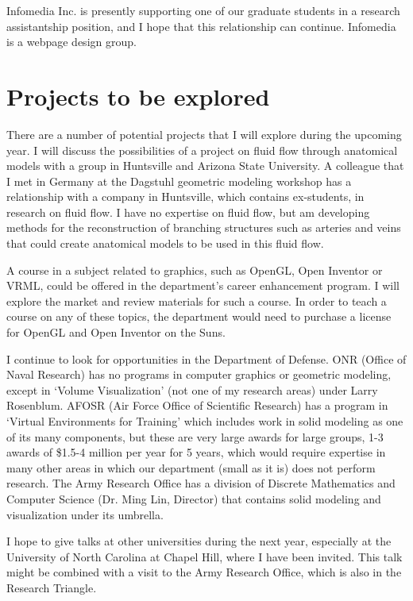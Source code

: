 Infomedia Inc. is presently supporting one of our graduate students
in a research assistantship position, and I hope that this relationship 
can continue.  Infomedia is a webpage design group.

\section{Projects to be explored}

There are a number of potential projects that I will explore during
the upcoming year.
I will discuss the possibilities of a project on fluid flow
through anatomical models with a group in Huntsville and Arizona State University.
A colleague that I met in Germany at the Dagstuhl geometric modeling workshop
has a relationship with a company in Huntsville, which contains ex-students,
in research on fluid flow.
I have no expertise on fluid flow, but am developing methods for
the reconstruction of branching structures such as arteries and veins
that could create anatomical models to be used in this fluid flow.

A course in a subject related to graphics, such as OpenGL, Open Inventor or VRML,
could be offered in the department's career enhancement program.
I will explore the market and review materials for such a course.
In order to teach a course on any of these topics, 
the department would need to purchase
a license for OpenGL and Open Inventor on the Suns.

I continue to look for opportunities in the Department of Defense.
ONR (Office of Naval Research)
has no programs in computer graphics or geometric modeling,
except in `Volume Visualization' (not one of my research areas) 
under Larry Rosenblum.
AFOSR (Air Force Office of Scientific Research) has a
program in `Virtual Environments for Training' which includes work
in solid modeling as one of its many components, 
but these are very large awards for large groups,
1-3 awards of \$1.5-4 million per year for 5 years,
which would require expertise in many other areas in which our department
(small as it is) does not perform research.
The Army Research Office has a division of Discrete Mathematics and
Computer Science (Dr. Ming Lin, Director)
that contains solid modeling and visualization under its umbrella.

I hope to give talks at other universities during the next year,
especially at the University of North Carolina at Chapel Hill,
where I have been invited.
This talk might be combined with a visit to the Army Research Office,
which is also in the Research Triangle.


